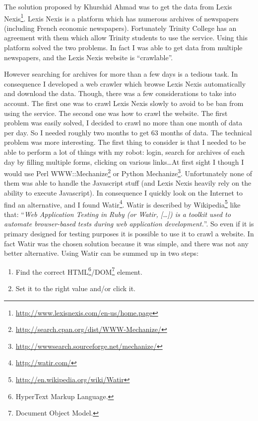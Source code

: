 \documentclass[12pt]{report}
\begin{document}
The solution proposed by Khurshid Ahmad was to get the data from Lexis Nexis\footnote{\url{http://www.lexisnexis.com/en-us/home.page}}. Lexis Nexis is a platform which has numerous archives of newspapers (including French economic newspapers). Fortunately Trinity College has an agreement with them which allow Trinity students to use the service. Using this platform solved the two problems. In fact I was able to get data from multiple newspapers, and the Lexis Nexis website is ``crawlable''.

However searching for archives for more than a few days is a tedious task. In consequence I developed a web crawler which browse Lexis Nexis automatically and download the data. Though, there was a few considerations to take into account. The first one was to crawl Lexis Nexis slowly to avoid to be ban from using the service. The second one was how to crawl the website. The first problem was easily solved, I decided to crawl no more than one month of data per day. So I needed roughly two months to get 63 months of data. The technical problem was more interesting. The first thing to consider is that I needed to be able to perform a lot of things with my robot: login, search for archives of each day by filling multiple forms, clicking on various links\ldots At first sight I though I would use Perl WWW::Mechanize\footnote{\url{http://search.cpan.org/dist/WWW-Mechanize/}} or Python Mechanize\footnote{\url{http://wwwsearch.sourceforge.net/mechanize/}}. Unfortunately none of them was able to handle the Javascript stuff (and Lexis Nexis heavily rely on the ability to execute Javascript). In consequence I quickly look on the Internet to find an alternative, and I found Watir\footnote{\url{http://watir.com/}}. Watir is described by Wikipedia\footnote{\url{http://en.wikipedia.org/wiki/Watir}} like that: ``\emph{Web Application Testing in Ruby (or Watir, [\ldots]) is a toolkit used to automate browser-based tests during web application development.}''. So even if it is primary designed for testing purposes it is possible to use it to crawl a website. In fact Watir was the chosen solution because it was simple, and there was not any better alternative. Using Watir can be summed up in two steps:
\begin{enumerate}
	\item Find the correct HTML\footnote{HyperText Markup Language.}/DOM\footnote{Document Object Model.} element.
	\item Set it to the right value and/or click it.
\end{enumerate}
\end{document}

